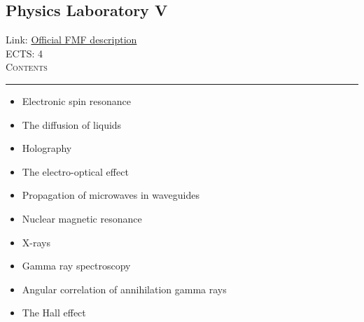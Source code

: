 \documentclass[11pt, a4paper]{article}
\newenvironment{course}[3]{
\subsection{#1}%
Link: \href{#2}{Official FMF description}\\%
ECTS: #3%
\vspace{1ex}
\\
{\large \textsc{Contents}}\\[-0.9ex]%
\rule{\textwidth}{0.5pt}
\vspace{-3ex}
}
{}
\newenvironment{chapter}[1]{
\begin{tcolorbox}[title=#1, breakable]
}
{\end{tcolorbox}}
\begin{document}
\begin{course}{Physics Laboratory V}{https://www.fmf.uni-lj.si/en/study-physics/programmes/1fiz/2020/7000777/courses/1146/}{4}
    \label{physics_laboratory_5}

    \begin{chapter}{Experiments}
        \begin{itemize}
            
            \item Electronic spin resonance

            \item The diffusion of liquids

            \item Holography

            \item The electro-optical effect

            \item Propagation of microwaves in waveguides

            \item Nuclear magnetic resonance

            \item X-rays

            \item Gamma ray spectroscopy

            \item Angular correlation of annihilation gamma rays

            \item The Hall effect
            
        \end{itemize}
    \end{chapter}
\end{course}
\end{document}
